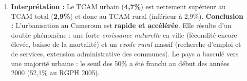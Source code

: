 \documentclass[11pt]{article}
\begin{document}
\begin{exoresolu}
\begin{enumerate}
    \[TCAM_{tot} = \left( \sqrt[18]{\frac{17\,463\,836}{10\,493\,655}} - 1 \right) \times 100 = \left( \sqrt[18]{1,664} - 1 \right) \times 100\]
    $\ln(1,664) \approx 0,5094$ ; $\frac{0,5094}{18} \approx 0,02830$ ; $e^{0,02830} \approx 1,0287$
    \[TCAM_{tot} \approx (1,0287 - 1) \times 100 = \textbf{2,9\% par an}.\]
    \item \textbf{Interprétation :}
    Le TCAM urbain (\textbf{4,7\%}) est nettement supérieur au TCAM total (\textbf{2,9\%}) et donc au TCAM rural (inférieur à 2,9\%).
    \textbf{Conclusion :} L'urbanisation au Cameroun est \textbf{rapide et accélérée}. Elle résulte d'un double phénomène : une forte \emph{croissance naturelle} en ville (fécondité encore élevée, baisse de la mortalité) et un \emph{exode rural} massif (recherche d'emploi et de services, extension administrative des communes). Le pays a basculé vers une majorité urbaine : le seuil des 50\% a été franchi au début des années 2000 (52,1\% au RGPH 2005).
\end{enumerate}
\end{exoresolu}
\end{document}
